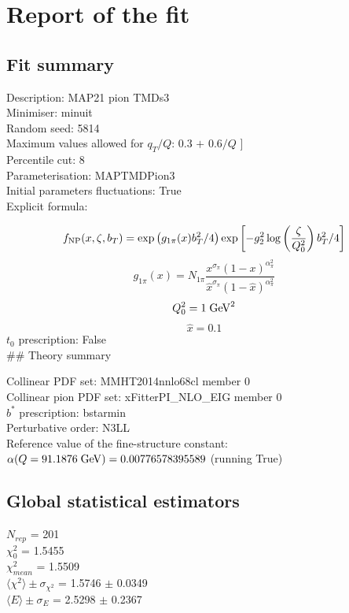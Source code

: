 \documentclass[]{article}
\date{}
\begin{document}
\hypertarget{report-of-the-fit}{%
\section{Report of the fit}\label{report-of-the-fit}}

\hypertarget{fit-summary}{%
\subsection{Fit summary}\label{fit-summary}}

Description: MAP21 pion TMDs3\\
Minimiser: minuit\\
Random seed: 5814\\
Maximum values allowed for \(q_T / Q\): 0.3 \(+\) 0.6\(/ Q\) {]}\\
Percentile cut: 8\\
Parameterisation: MAPTMDPion3\\
Initial parameters fluctuations: True\\
Explicit formula:

\[f_{\rm NP}(x,\zeta, b_T)= \exp \left( g_{1\pi}(x) b_T^2 / 4 \right) \exp\left[- g^2_2 \log\left(\frac{\zeta}{Q_0^2}\right) b_T^2/4 \right]\]\[g_{1\pi}(x) = N_{1\pi} \frac{x^{\sigma_{\pi}}(1-x)^{\alpha^2_{\pi}}}{\hat{x}^{\sigma_{\pi}}(1-\hat{x})^{\alpha^2_{\pi}}}\]\[Q_0^2 = 1\;{\rm GeV}^2\]\[\hat{x} = 0.1\]
\(t_0\) prescription: False\\
\#\# Theory summary

Collinear PDF set: MMHT2014nnlo68cl member 0\\
Collinear pion PDF set: xFitterPI\_NLO\_EIG member 0\\
\(b^*\) prescription: bstarmin\\
Perturbative order: N3LL\\
Reference value of the fine-structure constant:
\(\alpha(Q = 91.1876\;{\rm GeV}) = 0.00776578395589\) (running True)

\hypertarget{global-statistical-estimators}{%
\subsection{Global statistical
estimators}\label{global-statistical-estimators}}

\(N_{rep}\) = 201\\
\(\chi_{0}^2\) = 1.5455\\
\(\chi_{mean}^2\) = 1.5509\\
\(\langle\chi^2\rangle \pm \sigma_{\chi^2}\) = 1.5746 \(\pm\) 0.0349\\
\(\langle E \rangle \pm \sigma_{E}\) = 2.5298 \(\pm\) 0.2367
\end{document}

